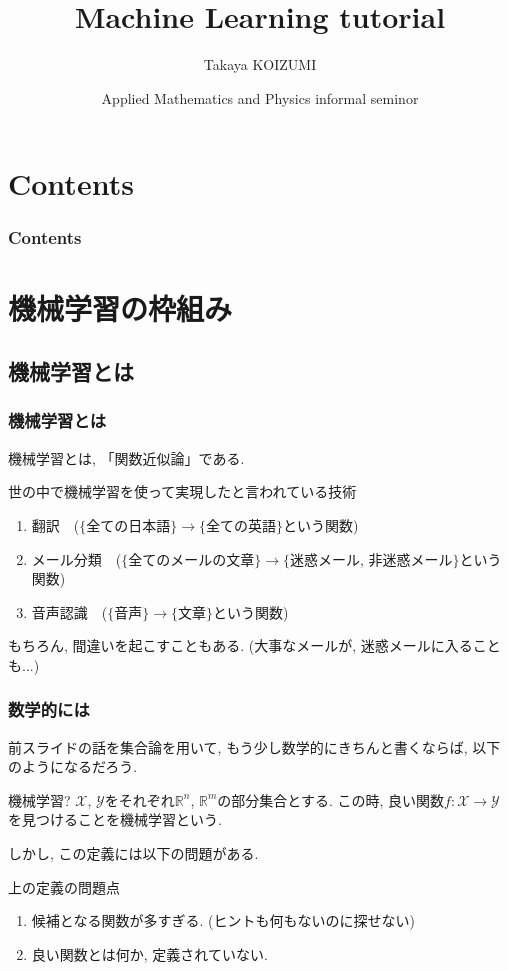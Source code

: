 \documentclass[dvipdfmx,11pt]{beamer}		%
\title{Machine Learning tutorial}
\author{Takaya KOIZUMI}
\institute{Mathematical Science, B4}
\date{Applied Mathematics and Physics informal seminor}
\newcommand{\R}{\mathbb{R}}
\newcommand{\X}{\mathcal{X}}
\newcommand{\Y}{\mathcal{Y}}
\begin{document}
    \begin{frame}\frametitle{}
        \titlepage
    \end{frame}
    \section*{Contents}
    \begin{frame}\frametitle{Contents}
        \tableofcontents
    \end{frame}
    \section{機械学習の枠組み}
    \subsection{機械学習とは}
    \begin{frame}\frametitle{機械学習とは}
        機械学習とは, 「関数近似論」である.
        \begin{block}{世の中で機械学習を使って実現したと言われている技術}
            \begin{enumerate}
                \item 翻訳~~($\{$全ての日本語$\}$$\to$$\{$全ての英語$\}$という関数)
                \item メール分類~~($\{$全てのメールの文章$\}$$\to$$\{$迷惑メール, 非迷惑メール$\}$という関数)
                \item 音声認識~~($\{$音声$\}$$\to$$\{$文章$\}$という関数)
            \end{enumerate}
        \end{block}
        もちろん, 間違いを起こすこともある. (大事なメールが, 迷惑メールに入ることも...)
    \end{frame}
    \begin{frame}\frametitle{数学的には}
        前スライドの話を集合論を用いて, もう少し数学的にきちんと書くならば, 以下のようになるだろう.
        \begin{block}{機械学習?}
            $\X$, $\Y$をそれぞれ$\R^n$, $\R^m$の部分集合とする. 
            この時, 良い関数$f:\X\to\Y$を見つけることを機械学習という. 
        \end{block} 
        しかし, この定義には以下の問題がある.
        \begin{block}{上の定義の問題点}
            \begin{enumerate}
                \item 候補となる関数が多すぎる. (ヒントも何もないのに探せない)
                \item 良い関数とは何か, 定義されていない.
            \end{enumerate}
        \end{block}
    \end{frame}
\end{document}
